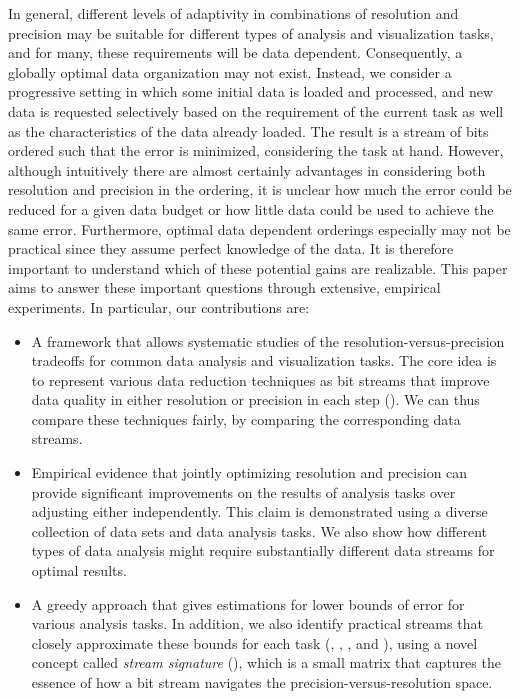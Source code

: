 In general, different levels of adaptivity in combinations of resolution and precision may be
suitable for different types of analysis and visualization tasks, and for many, these requirements
will be data dependent. Consequently, a globally optimal data organization may not exist. Instead,
we consider a progressive setting in which some initial data is loaded and processed, and new data
is requested selectively based on the requirement of the current task as well as the characteristics
of the data already loaded. The result is a stream of bits ordered such that the error is minimized,
considering the task at hand. However, although intuitively there are almost certainly advantages in
considering both resolution and precision in the ordering, it is unclear how much the error could be
reduced for a given data budget or how little data could be used to achieve the same error.
Furthermore, optimal data dependent orderings especially may not be practical since they assume
perfect knowledge of the data. It is therefore important to understand which of these potential
gains are realizable. This paper aims to answer these important questions through extensive,
empirical experiments. In particular, our contributions are:

\begin{itemize}
%
\item A framework that allows systematic studies of the resolution-versus-precision tradeoffs for
common data analysis and visualization tasks. The core idea is to represent various data reduction
techniques as bit streams that improve data quality in either resolution or precision in each step
(). We can thus compare these techniques fairly, by comparing the
corresponding data streams.
%  
\item Empirical evidence that jointly optimizing resolution and precision can provide significant
improvements on the results of analysis tasks over adjusting either independently. This claim is
demonstrated using a diverse collection of data sets and data analysis tasks. We also show how
different types of data analysis might require substantially different data streams for optimal
results.
%
\item A greedy approach that gives estimations for lower bounds of error for various analysis tasks.
In addition, we also identify practical streams that closely approximate these bounds for each task
(, , , and
), using a novel concept called \emph{stream signature}
(), which is a small matrix that captures the essence of how a bit stream
navigates the precision-versus-resolution space.
\end{itemize}


